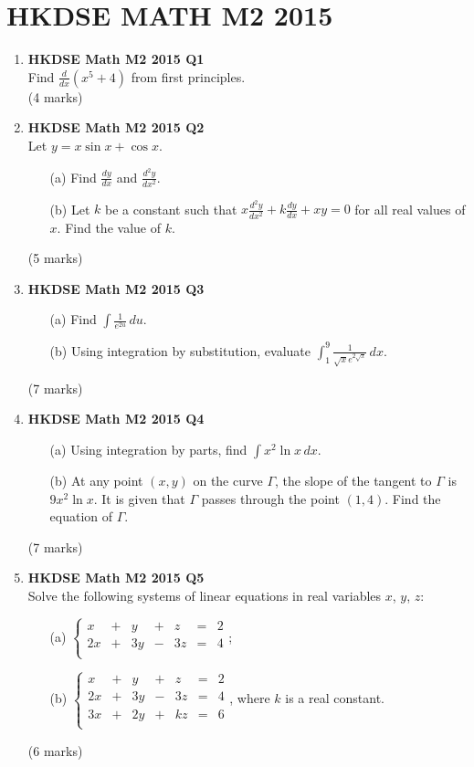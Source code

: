 \documentclass{report}
\begin{document}
\chapter{HKDSE MATH M2 2015}
\begin{enumerate}
	\item \textbf{HKDSE Math M2 2015 Q1}\\
	Find $\displaystyle \frac{d}{dx} (x^5+4)$ from first principles. \\(4 marks)

	\item \textbf{HKDSE Math M2 2015 Q2}\\
	Let $y=x\sin{x} + \cos{x}$.  
	\begin{enumerate}
		\item [(a)]Find $\displaystyle\frac{dy}{dx}$ and $\displaystyle\frac{d^2y}{dx^2}$.
		\item [(b)]Let $k$ be a constant such that $x\displaystyle\frac{d^2y}{dx^2} + k\displaystyle\frac{dy}{dx} + xy = 0$ for all real values of $x$. Find the value of $k$.
	\end{enumerate}
	(5 marks)

	\item \textbf{HKDSE Math M2 2015 Q3}
	\begin{enumerate}
		\item [(a)]Find $\displaystyle\int \frac{1}{e^{2u}} \,du$. 
		\item [(b)]Using integration by substitution, evaluate $\displaystyle\int_1^9 \frac{1}{\sqrt{x}e^{2\sqrt{x}}}\,dx$. 
	\end{enumerate}
	(7 marks)

	\item \textbf{HKDSE Math M2 2015 Q4}
	\begin{enumerate}
		\item [(a)]Using integration by parts, find $\displaystyle\int x^2 \ln{x} \,dx $. 
		\item [(b)]At any point $(x,y)$ on the curve $\Gamma $, the slope of the tangent to $\Gamma$ is $9x^2 \ln{x}$. It is given that $\Gamma$ passes through the point $(1,4)$. Find the equation of $\Gamma$.  
	\end{enumerate}
	(7 marks)

	\item \textbf{HKDSE Math M2 2015 Q5}\\
	Solve the following systems of linear equations in real variables $x$, $y$, $z$:
	\begin{enumerate}
		\item [(a)]$\left\{
			\begin{matrix}
				x&+&y&+&z&=&2\\
				2x&+&3y&-&3z&=&4\\
			\end{matrix}\right.$;
		\item [(b)]$\left\{
			\begin{matrix}
				x&+&y&+&z&=&2\\
				2x&+&3y&-&3z&=&4\\
				3x&+&2y&+&kz&=&6\\
			\end{matrix}\right.$, where $k$ is a real constant.
	\end{enumerate}
	(6 marks)


\end{enumerate}
\end{document}
